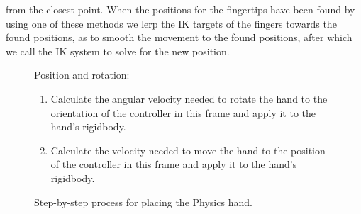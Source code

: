 from the closest point. When the positions for the fingertips have been found by using one of these methods we lerp the IK targets of the fingers towards the found positions, as to smooth the movement to the found positions, after which we call the IK system to solve for the new position.

\begin{figure}[H]
\centering
\small
\begin{flushleft}
Position and rotation:
\end{flushleft}
\begin{enumerate}[noitemsep]
\item Calculate the angular velocity needed to rotate the hand to the orientation of the controller in this frame and apply it to the hand's rigidbody.
\item Calculate the velocity needed to move the hand to the position of the controller in this frame and apply it to the hand's rigidbody.
\end{enumerate}
\caption{Step-by-step process for placing the Physics hand.}
\label{fig:stepByStepPhysicsHandPositionRotation}
\end{figure}

